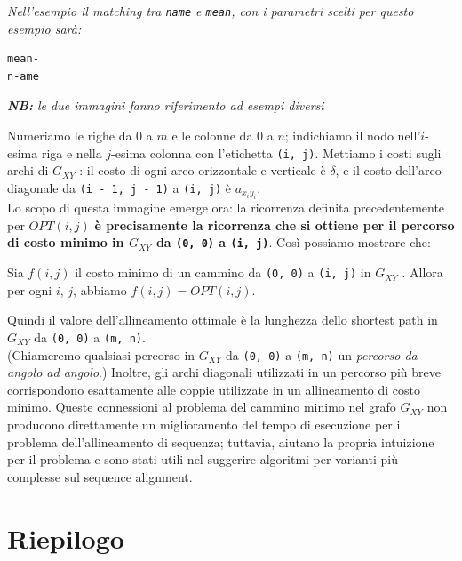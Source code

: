 \emph{Nell'esempio il matching tra \texttt{name} e \texttt{mean}, con i
	parametri scelti per questo esempio sarà:}

\begin{verbatim}
mean-
n-ame
\end{verbatim}

\emph{\textbf{NB:} le due immagini fanno riferimento ad esempi diversi}

Numeriamo le righe da 0 a $m$ e le colonne da 0 a $n$; indichiamo il
nodo nell'$i$-esima riga e nella $j$-esima colonna con l'etichetta
\texttt{(i,\ j)}. Mettiamo i costi sugli archi di $G_{XY}$ : il costo
di ogni arco orizzontale e verticale è $\delta$, e il costo dell'arco
diagonale da \texttt{(i\ -\ 1,\ j\ -\ 1)} a \texttt{(i,\ j)} è
$a_{x_i y_i}$.\\ Lo scopo di questa immagine emerge ora: la ricorrenza
definita precedentemente per $OPT(i, j)$ \textbf{è precisamente la
	ricorrenza che si ottiene per il percorso di costo minimo in $G_{XY}$
	da \texttt{(0,\ 0)} a \texttt{(i,\ j)}}. Così possiamo mostrare che:
\begin{myblockquote}
	Sia $f(i, j)$ il costo minimo di un cammino da
	\texttt{(0,\ 0)} a \texttt{(i,\ j)} in $G_{XY}$ . Allora per ogni
	$i$, $j$, abbiamo $f(i, j) = OPT(i, j)$.
\end{myblockquote}

Quindi il valore dell'allineamento ottimale è la lunghezza dello
shortest path in $G_{XY}$ da \texttt{(0,\ 0)} a \texttt{(m,\ n)}.\\
(Chiameremo qualsiasi percorso in $G_{XY}$ da \texttt{(0,\ 0)} a
\texttt{(m,\ n)} un \emph{percorso da angolo ad angolo}.) Inoltre, gli
archi diagonali utilizzati in un percorso più breve corrispondono
esattamente alle coppie utilizzate in un allineamento di costo minimo.
Queste connessioni al problema del cammino minimo nel grafo $G_{XY}$
non producono direttamente un miglioramento del tempo di esecuzione per
il problema dell'allineamento di sequenza; tuttavia, aiutano la propria
intuizione per il problema e sono stati utili nel suggerire algoritmi
per varianti più complesse sul sequence alignment.

\section{Riepilogo}

